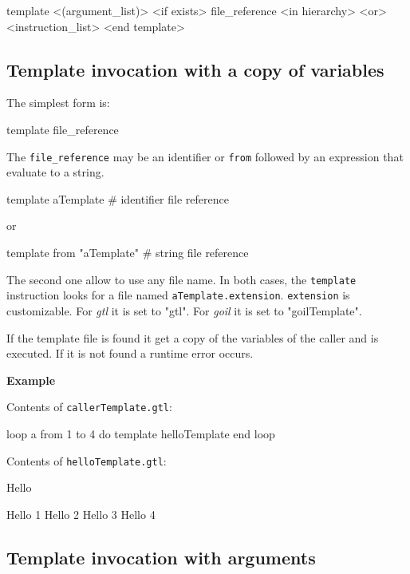 \documentclass[10pt,openright,twosides]{report}
\newcommand{\gtltype}[1]{{\small\ttfamily #1}}
\newcommand{\tool}[1]{{\em #1}}
\newcommand{\scst}[1]{{\footnotesize\ttfamily\colorbox{light-blue}{"#1"}}}
\newcommand{\gtlinline}[1]{\colorbox{light-blue}{\lstinline[language=gtl]{#1}}}
\newcommand{\example}{\vspace{.75em}\noindent\textbf{Example}\vspace{0em}}
\begin{document}
\begin{gtl}
template <(argument_list)> <if exists> file_reference <in hierarchy>
<or>
  <instruction_list>
<end template> 
\end{gtl}

\subsection{Template invocation with a copy of variables}

The simplest form is:

\begin{gtl}
template file_reference
\end{gtl}

The \gtlinline{file_reference} may be an identifier or \gtlinline{from} followed by an expression that evaluate to a \gtltype{string}.

\begin{gtl}
template aTemplate # identifier file reference
\end{gtl}

\noindent or

\begin{gtl}
template from "aTemplate" # string file reference
\end{gtl}

The second one allow to use any file name. In both cases, the \gtlinline{template} instruction looks for a file named \gtlinline{aTemplate.extension}. \gtlinline{extension} is customizable. For \tool{gtl} it is set to \scst{gtl}. For \tool{goil} it is set to \scst{goilTemplate}.

If the template file is found it get a copy of the variables of the caller and is executed. If it is not found a runtime error occurs.

\example

\noindent Contents of \texttt{\small callerTemplate.gtl}:

\begin{gtl}
loop a from 1 to 4 do
  template helloTemplate 
end loop
%
%
\end{gtl}
\noindent Contents of \texttt{\small helloTemplate.gtl}:
\begin{gtl-tmode}
Hello
\end{gtl-tmode}
\begin{templateoutput}
Hello 1 Hello 2 Hello 3 Hello 4 
\end{templateoutput}

\subsection{Template invocation with arguments}
\label{sec:templatesArgs}
\end{document}
